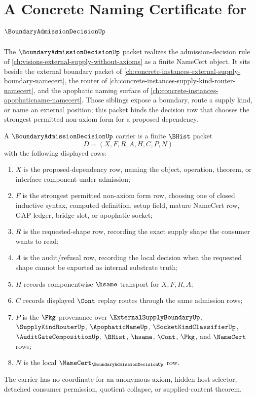 \chapter{A Concrete Naming Certificate for $\BoundaryAdmissionDecisionUp$}
\label{ch:concrete-instances-boundary-admission-decision-namecert}

The $\BoundaryAdmissionDecisionUp$ packet realizes the admission-decision rule of \autoref{ch:visions-external-supply-without-axioms} as a finite NameCert object. It sits beside the external boundary packet of \autoref{ch:concrete-instances-external-supply-boundary-namecert}, the router of \autoref{ch:concrete-instances-supply-kind-router-namecert}, and the apophatic naming surface of \autoref{ch:concrete-instances-apophaticname-namecert}. Those siblings expose a boundary, route a supply kind, or name an external position; this packet binds the decision row that chooses the strongest permitted non-axiom form for a proposed dependency.

\begin{definition}
\label{def:boundary-admission-decision-carrier}
A $\BoundaryAdmissionDecisionUp$ carrier is a finite $\BHist$ packet
$$
D=(X,F,R,A,H,C,P,N)
$$
with the following displayed rows:
\begin{enumerate}
\item $X$ is the proposed-dependency row, naming the object, operation, theorem, or interface component under admission;
\item $F$ is the strongest permitted non-axiom form row, choosing one of closed inductive syntax, computed definition, setup field, mature NameCert row, GAP ledger, bridge slot, or apophatic socket;
\item $R$ is the requested-shape row, recording the exact supply shape the consumer wants to read;
\item $A$ is the audit/refusal row, recording the local decision when the requested shape cannot be exported as internal substrate truth;
\item $H$ records componentwise $\hsame$ transport for $X,F,R,A$;
\item $C$ records displayed $\Cont$ replay routes through the same admission rows;
\item $P$ is the $\Pkg$ provenance over $\ExternalSupplyBoundaryUp$, $\SupplyKindRouterUp$, $\ApophaticNameUp$, $\SocketKindClassifierUp$, $\AuditGateCompositionUp$, $\BHist$, $\hsame$, $\Cont$, $\Pkg$, and $\NameCert$ rows;
\item $N$ is the local $\NameCert_{\BoundaryAdmissionDecisionUp}$ row.
\end{enumerate}
The carrier has no coordinate for an anonymous axiom, hidden host selector, detached consumer permission, quotient collapse, or supplied-content theorem.
\end{definition}

